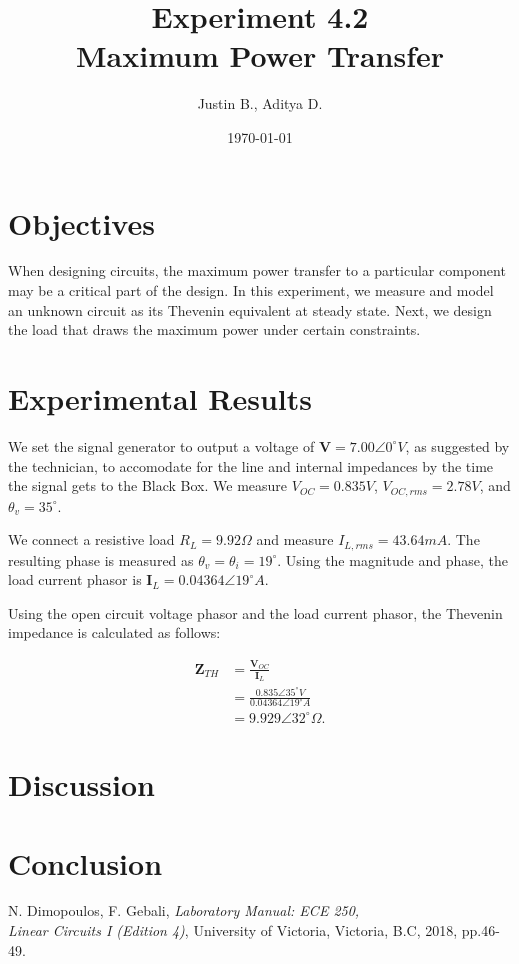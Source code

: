 \documentclass[12pt]{article}
\begin{document}
\title{Experiment 4.2\\Maximum Power Transfer}
\author{Justin B., Aditya D.}
\date{\today}
\maketitle
\pagebreak

\tableofcontents
\pagebreak
{}

\section{Objectives}
When designing circuits, the maximum power transfer to a particular component may be a critical part of the design.
In this experiment, we measure and model an unknown circuit as its Thevenin equivalent at steady state.
Next, we design the load that draws the maximum power under certain constraints.

\section{Experimental Results}
We set the signal generator to output a voltage of \(\bm{V} = 7.00\angle 0^\circ V\), as suggested by the technician, to accomodate for the line and internal impedances by the time the signal gets to the Black Box.
We measure \(V_{OC} = 0.835 V\), \(V_{OC, rms} = 2.78 V\), and \(\theta_v = 35^\circ\).

We connect a resistive load \(R_L = 9.92\Omega\) and measure \(I_{L, rms} = 43.64mA\).
The resulting phase is measured as \(\theta_v = \theta_i = 19^\circ\).
Using the magnitude and phase, the load current phasor is \(\bm{I}_L = 0.04364\angle 19^\circ A\).

Using the open circuit voltage phasor and the load current phasor, the Thevenin impedance is calculated as follows:

\begin{align*}
    \bm{Z}_{TH} &= \frac{\bm{V}_{OC}}{\bm{I}_L} \\
                &= \frac{0.835\angle 35^\circ V}{0.04364\angle 19^\circ A} \\
                &= 9.929\angle 32^\circ \Omega.
\end{align*}

\section{Discussion}
\section{Conclusion}

\newpage
{}
\begin{thebibliography}{1}
    N. Dimopoulos, F. Gebali, \textit{Laboratory Manual: ECE 250, \\ Linear Circuits I (Edition 4)}, University of Victoria, Victoria, B.C, 2018, pp.46-49.
    
\end{thebibliography}
\end{document}
